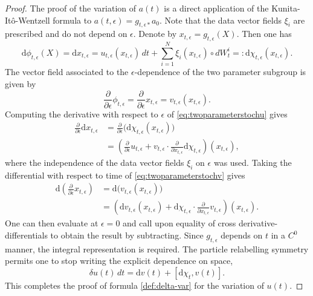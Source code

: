 \documentclass[10pt,a4paper]{amsart}
\def\rmd{{\mathrm{d}}}
\begin{document}
\begin{proof}
The proof of the variation of $a(t)$ is a direct application of the Kunita-It\^o-Wentzell formula to $a(t,\epsilon)=g_{t,\epsilon*}a_0$. Note that the data vector fields $\xi_i$ are prescribed and do not depend on $\epsilon$. Denote by $x_{t,\epsilon} = g_{t,\epsilon}(X)$. Then one has
\begin{equation}
{\rmd}\phi_{t,\epsilon}(X) = {\rmd}x_{t,\epsilon} = u_{t,\epsilon}(x_{t,\epsilon})\,dt + \sum_{i=1}^N \xi_i(x_{t,\epsilon})\circ dW_t^i =: {\rmd}\chi_{t,\epsilon}(x_{t,\epsilon}).
\label{eq:twoparameterstochu}
\end{equation}
The vector field associated to the $\epsilon$-dependence of the two parameter subgroup is given by
\begin{equation}
\frac{\partial}{\partial \epsilon}\phi_{t,\epsilon} = \frac{\partial}{\partial \epsilon}x_{t,\epsilon} = v_{t,\epsilon}(x_{t,\epsilon}).
\label{eq:twoparameterstochv}
\end{equation}
Computing the derivative with respect to $\epsilon$ of \eqref{eq:twoparameterstochu} gives
\begin{equation}
\begin{aligned}
\frac{\partial}{\partial \epsilon}{\rmd}x_{t,\epsilon} &= \frac{\partial}{\partial \epsilon}\big({\rmd}\chi_{t,\epsilon}(x_{t,\epsilon})\big)\\
&= \left(\frac{\partial}{\partial \epsilon}u_{t,\epsilon} + v_{t,\epsilon}\cdot\frac{\partial}{\partial x_{t,\epsilon}}{\rmd}\chi_{t,\epsilon}\right)(x_{t,\epsilon}),
\end{aligned}
\end{equation}
where the independence of the data vector fields $\xi_i$ on $\epsilon$ was used. Taking the differential with respect to time of \eqref{eq:twoparameterstochv} gives
\begin{equation}
\begin{aligned}
{\rmd}\left(\frac{\partial}{\partial \epsilon} x_{t,\epsilon}\right) &= {\rmd}\big(v_{t,\epsilon}(x_{t,\epsilon})\big)\\
&=  \left( {\rmd}v_{t,\epsilon}(x_{t,\epsilon}) + {\rmd}\chi_{t,\epsilon}\cdot\frac{\partial}{\partial x_{t,\epsilon}}v_{t,\epsilon}\right)(x_{t,\epsilon}).
\end{aligned}
\end{equation}
One can then evaluate at $\epsilon=0$ and call upon equality of cross derivative-differentials to obtain the result by subtracting. Since $g_{t,\epsilon}$ depends on $t$ in a $C^0$ manner, the integral representation is required. The particle relabelling symmetry permits one to stop writing the explicit dependence on space,
\begin{equation}
\delta u(t)\,dt = {\rmd}v(t) + [{\rmd}\chi_t,v(t)].
\end{equation}
This completes the proof of formula \eqref{def:delta-var} for the variation of $u(t)$.
\end{proof}
\end{document}
